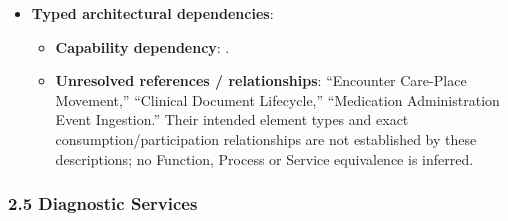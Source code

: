 \begin{itemize}
\begin{itemize}
\begin{itemize}
\item 
\emph{Exposed Service}: \texttt{} — Emits canonical discharge summaries to GPs and community providers.



\end{itemize}


\end{itemize}


\item 
\textbf{Typed architectural dependencies}:


\begin{itemize}

\item 
\textbf{Capability dependency}: \texttt{}.



\item 
\textbf{Unresolved references /\allowbreak{} relationships}: “Encounter Care-Place Movement,” “Clinical Document Lifecycle,” “Medication Administration Event Ingestion.” Their intended element types and exact consumption/\allowbreak{}participation relationships are not established by these descriptions; no Function, Process or Service equivalence is inferred.



\end{itemize}


\end{itemize}
\label{rad:sd:124}

\par\smallskip
{}\label{rad:sd:126}



\label{rad:sd:128}
\subsubsection*{2.5 Diagnostic Services}
\label{rad:sd:129}

